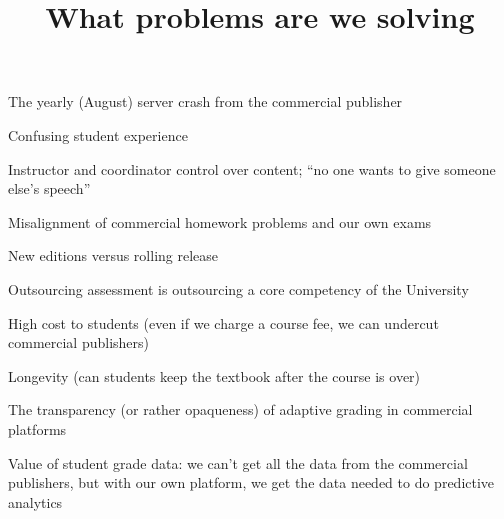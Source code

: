 \documentclass{ximera}
\title{What problems are we solving}
\begin{document}
\begin{abstract}
\end{abstract}
\maketitle

The yearly (August) server crash from the commercial publisher

Confusing student experience

Instructor and coordinator control over content; ``no one wants to give someone else's speech''

Misalignment of commercial homework problems and our own exams

New editions versus rolling release

Outsourcing assessment is outsourcing a core competency of the University

High cost to students (even if we charge a course fee, we can undercut commercial publishers)

Longevity (can students keep the textbook after the course is over)

The transparency (or rather opaqueness) of adaptive grading in commercial platforms

Value of student grade data: we can't get all the data from the commercial publishers, but with our own platform, we get the data needed to do predictive analytics
\end{document}
